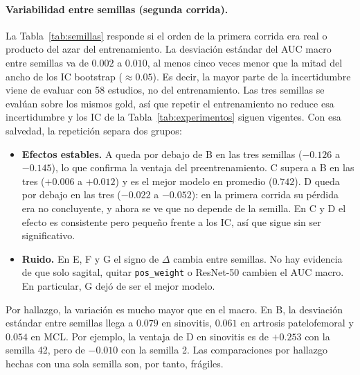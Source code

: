 \paragraph{Variabilidad entre semillas (segunda corrida).}
La Tabla~\ref{tab:semillas} responde si el orden de la primera corrida era real o producto del azar del entrenamiento.
La desviación estándar del AUC macro entre semillas va de $0.002$ a $0.010$, al menos cinco veces menor que la mitad del ancho de los IC bootstrap ($\approx0.05$).
Es decir, la mayor parte de la incertidumbre viene de evaluar con 58 estudios, no del entrenamiento.
Las tres semillas se evalúan sobre los mismos gold, así que repetir el entrenamiento no reduce esa incertidumbre y los IC de la Tabla~\ref{tab:experimentos} siguen vigentes.
Con esa salvedad, la repetición separa dos grupos:
\begin{itemize}
  \item \textbf{Efectos estables.} A queda por debajo de B en las tres semillas ($-0.126$ a $-0.145$), lo que confirma la ventaja del preentrenamiento. C supera a B en las tres ($+0.006$ a $+0.012$) y es el mejor modelo en promedio ($0.742$). D queda por debajo en las tres ($-0.022$ a $-0.052$): en la primera corrida su pérdida era no concluyente, y ahora se ve que no depende de la semilla. En C y D el efecto es consistente pero pequeño frente a los IC, así que sigue sin ser significativo.
  \item \textbf{Ruido.} En E, F y G el signo de $\Delta$ cambia entre semillas. No hay evidencia de que solo sagital, quitar \texttt{pos\_weight} o ResNet-50 cambien el AUC macro. En particular, G dejó de ser el mejor modelo.
\end{itemize}
Por hallazgo, la variación es mucho mayor que en el macro.
En B, la desviación estándar entre semillas llega a $0.079$ en sinovitis, $0.061$ en artrosis patelofemoral y $0.054$ en MCL.
Por ejemplo, la ventaja de D en sinovitis es de $+0.253$ con la semilla 42, pero de $-0.010$ con la semilla 2.
Las comparaciones por hallazgo hechas con una sola semilla son, por tanto, frágiles.

